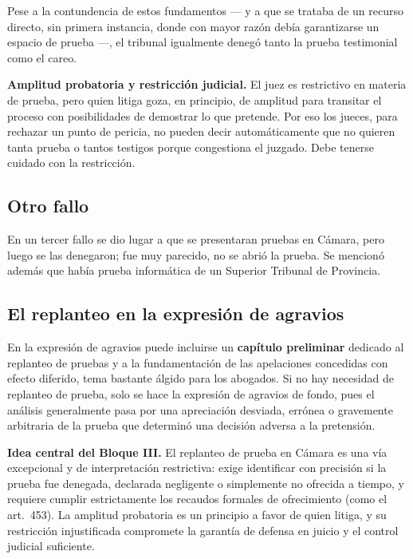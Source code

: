 \documentclass[12pt,oneside]{book}
\begin{document}
Pese a la contundencia de estos fundamentos --- y a que se trataba de un recurso directo, sin primera instancia, donde con mayor razón debía garantizarse un espacio de prueba ---, el tribunal igualmente denegó tanto la prueba testimonial como el careo.

\textbf{Amplitud probatoria y restricción judicial.} El juez es restrictivo en materia de prueba, pero quien litiga goza, en principio, de amplitud para transitar el proceso con posibilidades de demostrar lo que pretende. Por eso los jueces, para rechazar un punto de pericia, no pueden decir automáticamente que no quieren tanta prueba o tantos testigos porque congestiona el juzgado. Debe tenerse cuidado con la restricción.

\subsection{Otro fallo}

En un tercer fallo se dio lugar a que se presentaran pruebas en Cámara, pero luego se las denegaron; fue muy parecido, no se abrió la prueba. Se mencionó además que había prueba informática de un Superior Tribunal de Provincia.

\subsection{El replanteo en la expresión de agravios}

En la expresión de agravios puede incluirse un \textbf{capítulo preliminar} dedicado al replanteo de pruebas y a la fundamentación de las apelaciones concedidas con efecto diferido, tema bastante álgido para los abogados. Si no hay necesidad de replanteo de prueba, solo se hace la expresión de agravios de fondo, pues el análisis generalmente pasa por una apreciación desviada, errónea o gravemente arbitraria de la prueba que determinó una decisión adversa a la pretensión.

\begin{important}
\textbf{Idea central del Bloque III.} El replanteo de prueba en Cámara es una vía excepcional y de interpretación restrictiva: exige identificar con precisión si la prueba fue denegada, declarada negligente o simplemente no ofrecida a tiempo, y requiere cumplir estrictamente los recaudos formales de ofrecimiento (como el art.\ 453). La amplitud probatoria es un principio a favor de quien litiga, y su restricción injustificada compromete la garantía de defensa en juicio y el control judicial suficiente.
\end{important}
\end{document}
